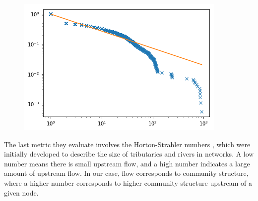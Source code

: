 \documentclass[12pt,twoside]{report}
\begin{document}
\begin{figure}[H]
\begin{center}
\begin{minipage}{0.45\linewidth}
\end{minipage}%
\hfill
\begin{minipage}{0.45\linewidth}
\includegraphics[width=\linewidth]{figures/1750_curve.png}
\end{minipage}
\end{center}
\end{figure}

The last metric they evaluate involves the Horton-Strahler numbers \cite{horton1945erosional, strahler1952dynamic}, which were initially developed to describe the size of tributaries and rivers in networks. A low number means there is small upstream flow, and a high number indicates a large amount of upstream flow. In our case, flow corresponds to community structure, where a higher number corresponds to higher community structure upstream of a given node. \\
\end{document}
